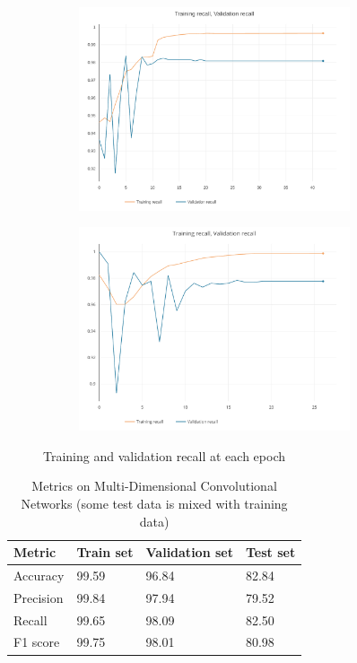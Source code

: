 \documentclass[journal]{IEEEtran}
\begin{document}
\begin{figure}[h]
	\centering

	\begin{subfigure}{0.49\textwidth}
		\centering
		\includegraphics[height = 6cm]{Images/recall.pdf}
	\end{subfigure}
	\hspace{1mm}
	\begin{subfigure}{0.49\textwidth}
		\centering
		\includegraphics[height = 6cm]{Images/recall1.pdf}
	\end{subfigure}
	
	\caption{Training and validation recall at each epoch}
\end{figure}

\begin{table}[H]
	\caption{Metrics on Multi-Dimensional Convolutional Networks (some test data is mixed with training data)}
	\centering
	\begin{tabular}{llll}
		\toprule
		Metric & Train set & Validation set & Test set
		\\
		\midrule
		Accuracy & 99.59 & 96.84 & 82.84
		\\
		Precision & 99.84 & 97.94 & 79.52
		\\
		Recall & 99.65 & 98.09 & 82.50
		\\
		F1 score & 99.75 & 98.01 & 80.98
		\\
		\bottomrule
	\end{tabular}
\end{table}
\end{document}
